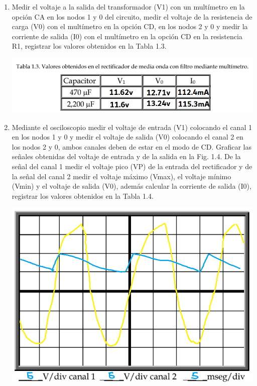 \documentclass[12pt]{article}
\begin{document}
\begin{enumerate}
\begin{enumerate}
                \item Medir el voltaje a la salida del transformador (V1) con un multímetro en la opción CA en
                los nodos 1 y 0 del circuito, medir el voltaje de la resistencia de carga (V0) con el multímetro
                en la opción CD, en los nodos 2 y 0 y medir la corriente de salida (I0) con el multímetro en
                la opción CD en la resistencia R1, registrar los valores obtenidos en la Tabla 1.3.
                \begin{center}
                    \includegraphics*[scale=0.55]{tabla1-3.png}
                \end{center}
                \item Mediante el osciloscopio medir el voltaje de entrada (V1) colocando el canal 1 en los nodos
                1 y 0 y medir el voltaje de salida (V0) colocando el canal 2 en los nodos 2 y 0, ambos canales
                deben de estar en el modo de CD. Graficar las señales obtenidas del voltaje de entrada y de
                la salida en la Fig. 1.4. De la señal del canal 1 medir el voltaje pico (VP) de la entrada del
                rectificador y de la señal del canal 2 medir el voltaje máximo (Vmax), el voltaje mínimo (Vmin)
                y el voltaje de salida (V0), además calcular la corriente de salida (I0), registrar los valores
                obtenidos en la Tabla 1.4.
                \begin{center}
                    \includegraphics*[scale=0.6]{fig1-4.png}

\end{center}
\end{enumerate}
\end{enumerate}
\end{document}

